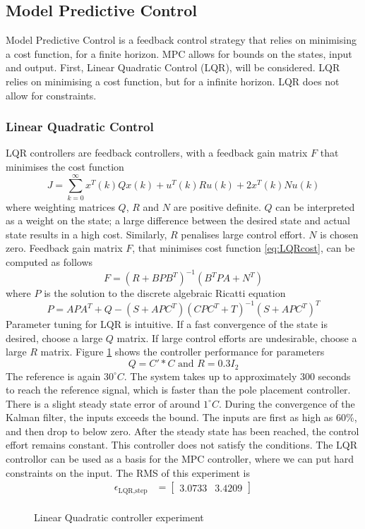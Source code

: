 \subsection{Model Predictive Control}
Model Predictive Control is a feedback control strategy that relies on minimising a cost function, for a finite horizon. MPC allows for bounds on the states, input and output. First, Linear Quadratic Control (LQR), will be considered. LQR relies on minimising a cost function, but for a infinite horizon. LQR does not allow for constraints.

\subsubsection{Linear Quadratic Control}
LQR controllers are feedback controllers, with a feedback gain matrix $F$ that minimises the cost function
\begin{equation}
    J = \sum_{k=0}^{\infty} x^T(k)Qx(k) + u^T(k)Ru(k) + 2x^T(k)Nu(k) \label{eq:LQRcost}
\end{equation}
where weighting matrices $Q$, $R$ and $N$ are positive definite. $Q$ can be interpreted as a weight on the state; a large difference between the desired state and actual state results in a high cost. Similarly, $R$ penalises large control effort. $N$ is chosen zero.
Feedback gain matrix $F$, that minimises cost function \ref{eq:LQRcost}, can be computed as follows
$$
F = (R+BPB^T)^{-1}(B^TPA+N^T)
$$
where $P$ is the solution to the discrete algebraic Ricatti equation
\begin{equation}
P = APA^T + Q - (S+APC^T)(CPC^T+T)^{-1}(S+APC^T)^T \label{eq:LQRricatti}
\end{equation}
Parameter tuning for LQR is intuitive. If a fast convergence of the state is desired, choose a large $Q$ matrix. If large control efforts are undesirable, choose a large $R$ matrix. Figure \ref{fig:LQR1} shows the controller performance for parameters
$$
Q = C'*C \text{ and } R = 0.3I_2
$$
The reference is again $30^{\circ}C$. The system takes up to approximately 300 seconds to reach the reference signal, which is faster than the pole placement controller. There is a slight steady state error of around  $1^{\circ}C$. During the convergence of the Kalman filter, the inputs exceeds the bound. The inputs are first as high as 60\%, and then drop to below zero. After the steady state has been reached, the control effort remains constant. This controller does not satisfy the conditions. The LQR controllor can be used as a basis for the MPC controller, where we can put hard constraints on the input. The RMS of this experiment is
\begin{align*}
    \epsilon_{\text{LQR,step}} &= \begin{bmatrix} 3.0733 & 3.4209\end{bmatrix}\\
\end{align*}
\begin{figure}[ht]
    \centering
    
    \caption{Linear Quadratic controller experiment}
    \label{fig:LQR1}
\end{figure}

